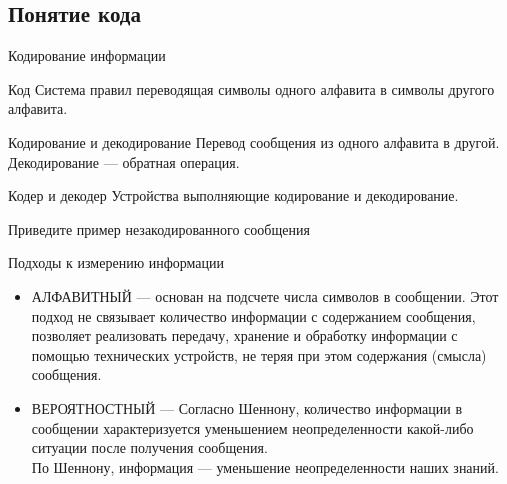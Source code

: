  \subsection{Понятие кода}
\begin{frame}{Кодирование информации}
\begin{block}{Код}
 Система правил переводящая символы одного алфавита в символы другого алфавита.
\end{block}
\pause
\begin{block}{Кодирование и декодирование}
 Перевод сообщения из одного алфавита в другой.
 Декодирование --- обратная операция.
\end{block}
\pause
\begin{block}{Кодер и декодер}
 Устройства выполняющие кодирование и декодирование.
\end{block}

Приведите пример незакодированного сообщения
\end{frame}

 \begin{frame}{Подходы к измерению информации}

 \begin{itemize}
	

\item АЛФАВИТНЫЙ --- основан на подсчете числа символов в сообщении. Этот подход не связывает количество информации с содержанием сообщения, позволяет реализовать передачу, хранение и обработку информации с помощью технических устройств, не теряя при этом содержания (смысла) сообщения.
\pause
\item ВЕРОЯТНОСТНЫЙ --- Согласно Шеннону, количество информации в сообщении характеризуется уменьшением неопределенности какой-либо ситуации после получения сообщения. \\
По Шеннону, информация --- уменьшение неопределенности наших знаний.
 \end{itemize}

\end{frame}
